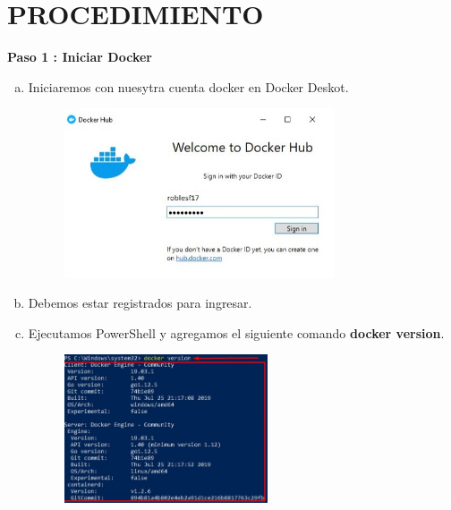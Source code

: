 \documentclass[preprint,12pt]{elsarticle}
\begin{document}
\section{PROCEDIMIENTO}
\textbf{Paso 1 : Iniciar Docker}
\begin{enumerate}[a)]
\item Iniciaremos con nuesytra cuenta docker en Docker Deskot.
\begin{figure}[htb]
	\begin{center}
		\includegraphics[width=8cm]{./IMAGENES/Docker01}
	\end{center}
\end{figure}
\item Debemos estar registrados para ingresar.
\item Ejecutamos PowerShell y agregamos el siguiente comando \textbf{docker version}.
\begin{figure}[htb]
	\begin{center}
		\includegraphics[width=6cm]{./IMAGENES/Docker02}
	\end{center}
\end{figure}



\end{enumerate}
\end{document}
